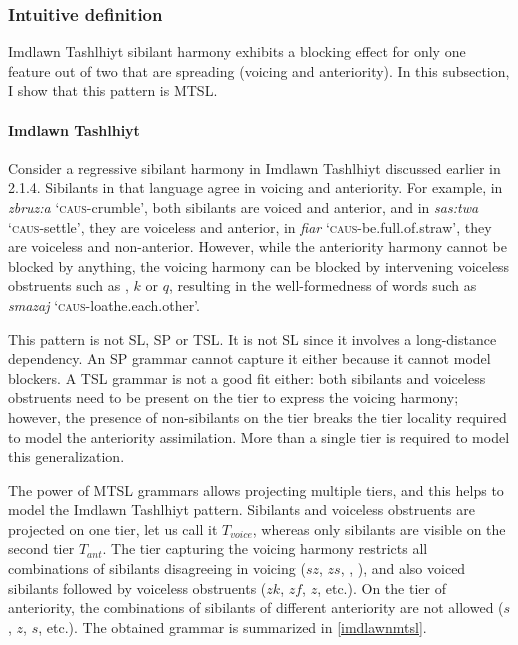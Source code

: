 \subsubsection{Intuitive definition}

Imdlawn Tashlhiyt sibilant harmony exhibits a blocking effect for only one feature out of two that are spreading (voicing and anteriority).
In this subsection, I show that this pattern is MTSL.

\paragraph{Imdlawn Tashlhiyt}
Consider a regressive sibilant harmony in Imdlawn Tashlhiyt discussed earlier in 2.1.4.
Sibilants in that language agree in voicing and anteriority.
For example, in \emph{zbruz:a} `\textsc{caus}-crumble', both sibilants are voiced and anterior, and in \emph{sas:twa} `\textsc{caus}-settle', they are voiceless and anterior, in \emph{\textesh fia\textesh r} `\textsc{caus}-be.full.of.straw', they are voiceless and non-anterior.
However, while the anteriority harmony cannot be blocked by anything, the voicing harmony can be blocked by intervening voiceless obstruents such as \textchi, $k$ or $q$, resulting in the well-formedness of words such as \emph{sm\textesh azaj} `\textsc{caus}-loathe.each.other'.

This pattern is not SL, SP or TSL.
It is not SL since it involves a long-distance dependency.
An SP grammar cannot capture it either because it cannot model blockers.
A TSL grammar is not a good fit either: both sibilants and voiceless obstruents need to be present on the tier to express the voicing harmony; however, the presence of non-sibilants on the tier breaks the tier locality required to model the anteriority assimilation.
More than a single tier is required to model this generalization.

The power of MTSL grammars allows projecting multiple tiers, and this helps to model the Imdlawn Tashlhiyt pattern.
Sibilants and voiceless obstruents are projected on one tier, let us call it $T_{voice}$, whereas only sibilants are visible on the second tier $T_{ant}$.
The tier capturing the voicing harmony restricts all combinations of sibilants disagreeing in voicing ($sz$, $zs$, \textesh\textyogh, \textyogh\textesh), and also voiced sibilants followed by voiceless obstruents ($zk$, $zf$, $z$\textchi, etc.).
On the tier of anteriority, the combinations of sibilants of different anteriority are not allowed ($s$\textesh, $z$\textesh, \textesh$s$, etc.).
The obtained grammar is summarized in \ref{imdlawnmtsl}.

